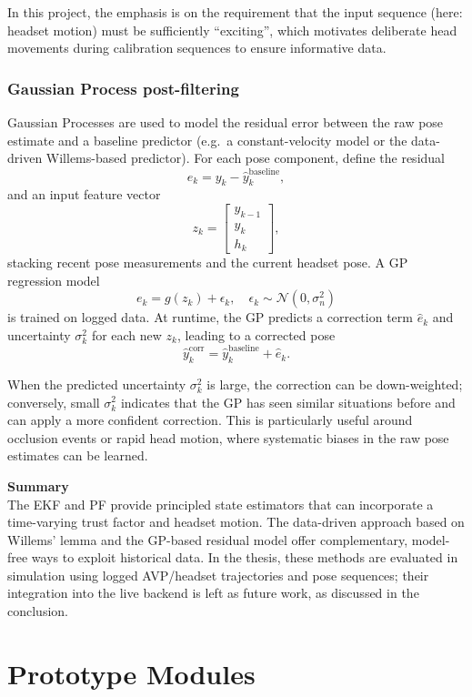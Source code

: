 In this project, the emphasis is on the requirement that the input sequence (here: headset motion) must be sufficiently “exciting”, which motivates deliberate head movements during calibration sequences to ensure informative data.

\subsubsection*{Gaussian Process post-filtering}

Gaussian Processes are used to model the residual error between the raw pose estimate and a baseline predictor (e.g.\ a constant-velocity model or the data-driven Willems-based predictor). For each pose component, define the residual
\[
e_k = y_k - \hat{y}_k^{\text{baseline}},
\]
and an input feature vector
\[
z_k =
\begin{bmatrix}
y_{k-1} \\
y_k \\
h_k
\end{bmatrix},
\]
stacking recent pose measurements and the current headset pose. A GP regression model
\[
e_k = g(z_k) + \epsilon_k,
\quad \epsilon_k \sim \mathcal{N}(0,\sigma_n^2)
\]
is trained on logged data. At runtime, the GP predicts a correction term $\hat{e}_k$ and uncertainty $\sigma_k^2$ for each new $z_k$, leading to a corrected pose
\[
\hat{y}_k^{\text{corr}} = \hat{y}_k^{\text{baseline}} + \hat{e}_k.
\]

When the predicted uncertainty $\sigma_k^2$ is large, the correction can be down-weighted; conversely, small $\sigma_k^2$ indicates that the GP has seen similar situations before and can apply a more confident correction. This is particularly useful around occlusion events or rapid head motion, where systematic biases in the raw pose estimates can be learned.

\textbf{Summary} \\
The EKF and PF provide principled state estimators that can incorporate a time-varying trust factor and headset motion. The data-driven approach based on Willems’ lemma and the GP-based residual model offer complementary, model-free ways to exploit historical data. In the thesis, these methods are evaluated in simulation using logged AVP/headset trajectories and pose sequences; their integration into the live backend is left as future work, as discussed in the conclusion.

\section{Prototype Modules}
\label{appendix:prototype-modules}

